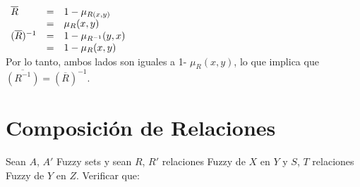 \documentclass[letterpaper,spanish,11pt]{article}
\begin{document}
\begin{enumerate}
$\begin{array}{l l l }\\
 \overline{R} &= &1-\mu_{R(x,y)}\\
 &= &\mu_{R}(x,y) \\
(\overline{R})^{-1} &= & 1- \mu_{R^{-1}}(y,x) \\
 &= & 1- \mu_{R}(x,y)
\end{array}$\\


Por lo tanto, ambos lados son iguales a 1- $\mu_{R}(x,y)$, lo
que implica que $\overline{(R^{-1})} = (\overline{R})^{-1}$.

\end{enumerate}

\section{Composici\'{o}n de Relaciones}
Sean $A$, $A'$ Fuzzy sets y sean $R$, $R'$ relaciones Fuzzy de $X$ en $Y$ y
$S$, $T$ relaciones Fuzzy de $Y$ en $Z$. Verificar que:
\end{document}
